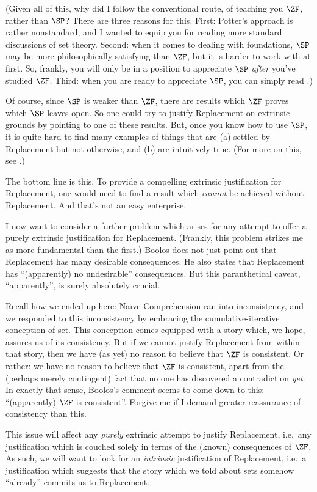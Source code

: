 \documentclass[../../../include/open-logic-section]{subfiles}
\begin{document}
(Given all of this, why did I follow the conventional route, of teaching you $\ZF$, rather than $\SP$? There are three reasons for this. First: Potter's approach is rather nonstandard, and I wanted to equip you for reading more standard discussions of set theory. Second: when it comes to dealing with foundations, $\SP$ may be more philosophically satisfying than $\ZF$, but it is harder to work with at first. So, frankly, you will only be in a position to appreciate $\SP$ \emph{after} you've studied $\ZF$. Third: when you are ready to appreciate $\SP$, you can simply read \citealt{Potter2004}.)

Of course, since $\SP$ is weaker than $\ZF$, there are results which $\ZF$ proves which $\SP$ leaves open. So one could try to justify Replacement on extrinsic grounds by pointing to one of these results. But, once you know how to use $\SP$, it is quite hard to find many examples of things that are (a) settled by Replacement but not otherwise, and (b) are intuitively true. (For more on this, see \citeauthor{Potter2004} \citeyear[\S13.2]{Potter2004}.)

The bottom line is this. To provide a compelling extrinsic justification for Replacement, one would need to find a result which \emph{cannot} be achieved without Replacement. And that's not an easy enterprise. 

I now want to consider a further problem which arises for any attempt to offer a purely extrinsic justification for Replacement. (Frankly, this problem strikes me as more fundamental than the first.) Boolos does not just point out that Replacement has many desirable consequences. He also states that Replacement has ``(apparently) no undesirable'' consequences. But this paranthetical caveat, ``apparently'', is surely absolutely crucial. 

Recall how we ended up here: Na\"ive Comprehension ran into inconsistency, and we responded to this inconsistency by embracing the cumulative-iterative conception of set. This conception comes equipped with a story which, we hope, assures us of its consistency. But if we cannot justify Replacement from within that story, then we have (as yet) no reason to believe that $\ZF$ is consistent. Or rather: we have no reason to believe that $\ZF$ is consistent, apart from the (perhaps merely contingent) fact that no one has discovered a contradiction \emph{yet}. In exactly that sense, Boolos's comment seems to come down to this: ``(apparently) $\ZF$ is consistent''. Forgive me if I demand greater reassurance of consistency than this. 

This issue will affect any \emph{purely} extrinsic attempt to justify Replacement, i.e.\ any justification which is couched solely in terms of the (known) consequences of $\ZF$. As such, we will want to look for an \emph{intrinsic} justification of Replacement, i.e.\ a justification which suggests that the story which we told about sets somehow ``already'' commits us to Replacement. 
\end{document}
